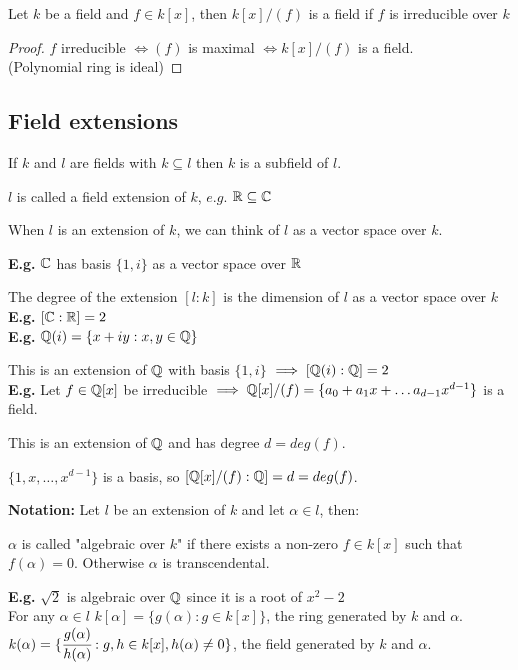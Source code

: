 \documentclass[11pt]{article}
\begin{document}
\begin{cor}
	Let $k$ be a field and $f \in k[x]$, then $k[x]/(f)$ is a field if $f$ is irreducible over $k$
\end{cor}
\begin{proof}
	$f $ irreducible $\iff (f) $ is maximal $ \iff k[x]/(f) $ is a field.\\
	(Polynomial ring is ideal)
\end{proof}

\subsection{Field extensions}
\begin{defn}
If $k $ and $l$ are fields with $k \subseteq l$ then $k$ is a subfield of $l$. 

$l$ is called a field extension of $k$, $e.g.$ $\mathbb{R} \subseteq \mathbb{C}$ 
\end{defn}
When $l$ is an extension of $k$, we can think of $l$ as a vector space over $k$.

$ $\\
\textbf{E.g.} $\mathbb{C}$ has basis $\{1,i\}$ as a vector space over $\mathbb{R}$

The degree of the extension $[l:k]$ is the dimension of $l$ as a vector space over $k$ \\
\textbf{E.g.} $[\mathbb{C} : \mathbb{R}] = 2$ \\
\textbf{E.g.} $\mathbb{Q}(i) = \{x+iy : x,y \in \mathbb{Q} \}$

This is an extension of $\mathbb{Q}$ with basis $\{1,i\} $ $\implies [\mathbb{Q}(i) : \mathbb{Q}] = 2$
$ $\\[0.5em]
\textbf{E.g.} Let $f \in \mathbb{Q}[x] $ be irreducible $\implies \mathbb{Q}[x] /(f) = \{a_0 + a_1x + \dots a_{d-1}x^{d-1} \} $ is a field.

This is an extension of $\mathbb{Q}$ and has degree $d=deg(f)$.

$\{ 1,x,\dots, x^{d-1} \}$ is a basis, so $[\mathbb{Q}[x]/(f) :\mathbb{Q}] = d = deg(f)$.

$ $\\
\textbf{Notation: } Let $l$ be an extension of $k$ and let $\alpha \in l$, then:

\begin{defn}
	$\alpha$ is called "algebraic over $k$" if there exists a non-zero $f \in k[x] $ such that $f(\alpha) = 0$.
	Otherwise $\alpha$ is transcendental.
\end{defn}
$ $\\[-0.5em]
\textbf{E.g.} $\sqrt{2} $ is algebraic over $\mathbb{Q}$ since it is a root of $x^2 - 2$
$ $\\[1em]
For any $\alpha \in l$ $k[\alpha] = \{ g(\alpha) : g \in k[x]\}$, the ring generated by $k$ and $\alpha$.
$ $\\
$k(\alpha) = \{ \cfrac{g(\alpha)}{h(\alpha)} : g,h \in k[x], h(\alpha) \neq 0\}$, the field generated by $k$ and $\alpha$.
\end{document}
